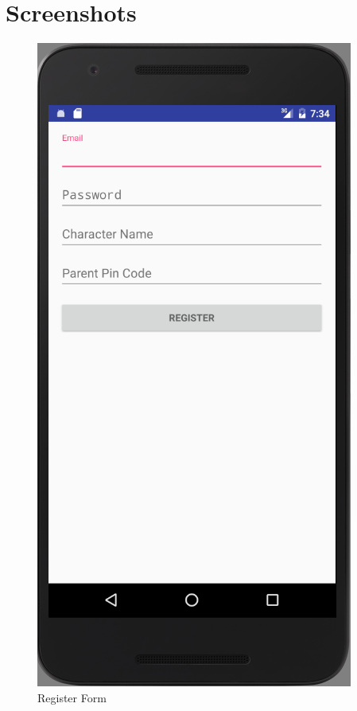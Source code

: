\chapter{Screenshots}

\begin{figure}[ht] 
  \begin{minipage}[b]{0.45\linewidth}
    \centering
    \includegraphics[width=.7\linewidth, frame]{../images/Screenshot/RegisterPage.png} 
    \caption{Register Form} 
    \vspace{4ex}
  \end{minipage}%
  \begin{minipage}[b]{0.45\linewidth}
    \centering

\end{minipage}
\end{figure}
